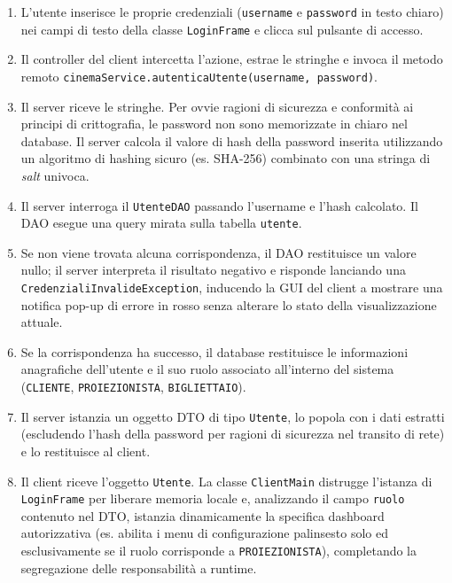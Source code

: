 \documentclass{article}
\begin{document}
\begin{enumerate}
    \item L'utente inserisce le proprie credenziali (\texttt{username} e \texttt{password} in testo chiaro) nei campi di testo della classe \texttt{LoginFrame} e clicca sul pulsante di accesso.
    \item Il controller del client intercetta l'azione, estrae le stringhe e invoca il metodo remoto \texttt{cinemaService.autenticaUtente(username, password)}.
    \item Il server riceve le stringhe. Per ovvie ragioni di sicurezza e conformità ai principi di crittografia, le password non sono memorizzate in chiaro nel database. Il server calcola il valore di hash della password inserita utilizzando un algoritmo di hashing sicuro (es. SHA-256) combinato con una stringa di \textit{salt} univoca.
    \item Il server interroga il \texttt{UtenteDAO} passando l'username e l'hash calcolato. Il DAO esegue una query mirata sulla tabella \texttt{utente}.
    \item Se non viene trovata alcuna corrispondenza, il DAO restituisce un valore nullo; il server interpreta il risultato negativo e risponde lanciando una \texttt{CredenzialiInvalideException}, inducendo la GUI del client a mostrare una notifica pop-up di errore in rosso senza alterare lo stato della visualizzazione attuale.
    \item Se la corrispondenza ha successo, il database restituisce le informazioni anagrafiche dell'utente e il suo ruolo associato all'interno del sistema (\texttt{CLIENTE}, \texttt{PROIEZIONISTA}, \texttt{BIGLIETTAIO}).
    \item Il server istanzia un oggetto DTO di tipo \texttt{Utente}, lo popola con i dati estratti (escludendo l'hash della password per ragioni di sicurezza nel transito di rete) e lo restituisce al client.
    \item Il client riceve l'oggetto \texttt{Utente}. La classe \texttt{ClientMain} distrugge l'istanza di \texttt{LoginFrame} per liberare memoria locale e, analizzando il campo \texttt{ruolo} contenuto nel DTO, istanzia dinamicamente la specifica dashboard autorizzativa (es. abilita i menu di configurazione palinsesto solo ed esclusivamente se il ruolo corrisponde a \texttt{PROIEZIONISTA}), completando la segregazione delle responsabilità a runtime.
\end{enumerate}
\end{document}
